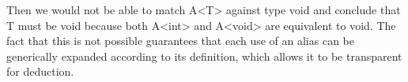 Then we would not be able to match A<T> against type void and conclude that T must be void because both A<int> and A<void> are equivalent to void. The fact that this is not possible guarantees that each use of an alias can be generically expanded according to its definition, which allows it to be transparent for deduction.

























